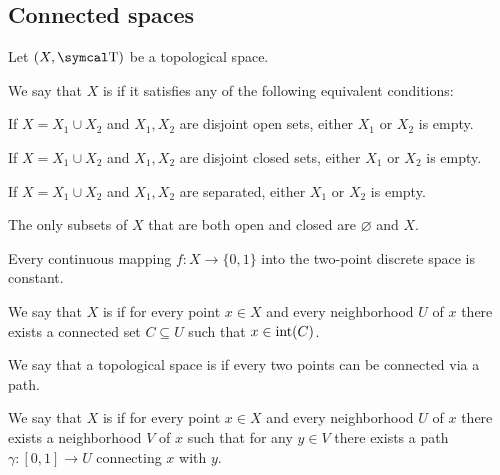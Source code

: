 \subsection{Connected spaces}\label{subsec:connected_sets}

Let \( (X, \CT) \) be a topological space.

\begin{definition}\label{def:connected_space}\cite[theorem 6.1.1]{Engelking1989}
  We say that \( X \) is  if it satisfies any of the following equivalent conditions:
  \begin{defenum}
     If \( X = X_1 \cup X_2 \) and \( X_1, X_2 \) are disjoint open sets, either \( X_1 \) or \( X_2 \) is empty.

     If \( X = X_1 \cup X_2 \) and \( X_1, X_2 \) are disjoint closed sets, either \( X_1 \) or \( X_2 \) is empty.

     If \( X = X_1 \cup X_2 \) and \( X_1, X_2 \) are separated, either \( X_1 \) or \( X_2 \) is empty.

     The only subsets of \( X \) that are both open and closed are \( \varnothing \) and \( X \).

     Every continuous mapping \( f: X \to \{ 0, 1 \} \) into the two-point discrete space is constant.
  \end{defenum}
\end{definition}

\begin{definition}\label{def:locally_connected}\cite[exercise 6.3.3]{Engelking1989}
  We say that \( X \) is  if for every point \( x \in X \) and every neighborhood \( U \) of \( x \) there exists a connected set \( C \subseteq U \) such that \( x \in \operatorname{int}(C) \).
\end{definition}

\begin{definition}\label{def:path_connected}\cite[exercise 6.3.9]{Engelking1989}
  We say that a topological space is  if every two points can be connected via a path.
\end{definition}

\begin{definition}\label{def:locally_path_connected}\cite[exercise 6.3.10]{Engelking1989}
  We say that \( X \) is  if for every point \( x \in X \) and every neighborhood \( U \) of \( x \) there exists a neighborhood \( V \) of \( x \) such that for any \( y \in V \) there exists a path \( \gamma: [0, 1] \to U \) connecting \( x \) with \( y \).
\end{definition}


